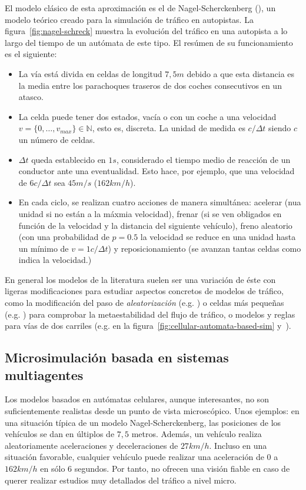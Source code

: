 El modelo clásico de esta aproximación es el de Nagel-Scherckenberg (\cite{Nagel1992}), un modelo teórico creado para la simulación de tráfico en autopistas. La figura~\ref{fig:nagel-schreck} muestra la evolución del tráfico en una autopista a lo largo del tiempo de un autómata de este tipo. El resúmen de su funcionamiento es el siguiente:

\begin{itemize}
	\item La vía está divida en celdas de longitud $7,5m$ debido a que esta distancia es la media entre los parachoques traseros de dos coches consecutivos en un atasco.
	\item La celda puede tener dos estados, vacía o con un coche a una velocidad $v = \{0, \ldots, v_{max}\} \in \mathbb{N}$, esto es, discreta. La unidad de medida es $c/\Delta t$ siendo $c$ un número de celdas.
	\item $\Delta t$ queda establecido en $1s$, considerado el tiempo medio de reacción de un conductor ante una eventualidad. Esto hace, por ejemplo, que una velocidad de $6 c/\Delta t$ sea $45 m/s$ ($162 km/h$).
	\item En cada ciclo, se realizan cuatro acciones de manera simultánea: acelerar (nua unidad si no están a la máxmia velocidad), frenar (si se ven obligados en función de la velocidad y la distancia del siguiente vehículo), freno aleatorio (con una probabilidad de $p = 0.5$ la velocidad se reduce en una unidad hasta un mínimo de $v = 1 c/\Delta t$) y reposicionamiento (se avanzan tantas celdas como indica la velocidad.)
\end{itemize}

En general los modelos de la literatura suelen ser una variación de éste con ligeras modificaciones para estudiar aspectos concretos de modelos de tráfico, como la modificación del paso de \textit{aleatorización} (e.g. \cite{Barlovic1998}) o celdas más pequeñas (e.g. \cite{Krauss1997}) para comprobar la metaestabilidad del flujo de tráfico, o modelos y reglas para vías de dos carriles (e.g. \cite{Brilon1999} en la figura~\ref{fig:cellular-automata-based-sim} y~\cite{Nagel1998}).

\subsection{Microsimulación basada en sistemas multiagentes}

Los modelos basados en autómatas celulares, aunque interesantes, no son suficientemente realistas desde un punto de vista microscópico. Unos ejemplos: en una situación típica de un modelo Nagel-Scherckenberg, las posiciones de los vehículos se dan en últiplos de $7,5$ metros. Además, un vehículo realiza aleatoriamente aceleraciones y deceleraciones de $27 km/h$. Incluso en una situación favorable, cualquier vehículo puede realizar una aceleración de $0$ a $162km/h$ en sólo $6$ segundos. Por tanto, no ofrecen una visión fiable en caso de querer realizar estudios muy detallados del tráfico a nivel micro.

